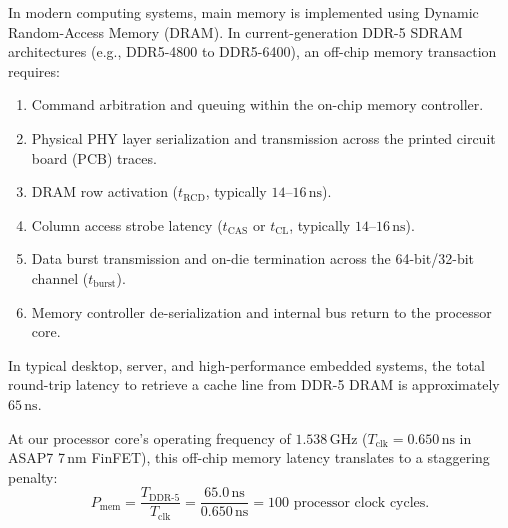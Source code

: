 In modern computing systems, main memory is implemented using Dynamic Random-Access Memory (DRAM). In current-generation DDR-5 SDRAM architectures (e.g., DDR5-4800 to DDR5-6400), an off-chip memory transaction requires:
\begin{enumerate}
    \item Command arbitration and queuing within the on-chip memory controller.
    \item Physical PHY layer serialization and transmission across the printed circuit board (PCB) traces.
    \item DRAM row activation ($t_{\text{RCD}}$, typically $14\text{--}16\,\text{ns}$).
    \item Column access strobe latency ($t_{\text{CAS}}$ or $t_{\text{CL}}$, typically $14\text{--}16\,\text{ns}$).
    \item Data burst transmission and on-die termination across the 64-bit/32-bit channel ($t_{\text{burst}}$).
    \item Memory controller de-serialization and internal bus return to the processor core.
\end{enumerate}
In typical desktop, server, and high-performance embedded systems, the total round-trip latency to retrieve a cache line from DDR-5 DRAM is approximately $65\,\text{ns}$.

At our processor core's operating frequency of $1.538\,\text{GHz}$ ($T_{\text{clk}} = 0.650\,\text{ns}$ in ASAP7 7\,nm FinFET), this off-chip memory latency translates to a staggering penalty:
\begin{equation}\label{eq:riscv_dram_latency}
P_{\text{mem}} = \frac{T_{\text{DDR-5}}}{T_{\text{clk}}} = \frac{65.0\,\text{ns}}{0.650\,\text{ns}} = 100 \text{ processor clock cycles}.
\end{equation}

